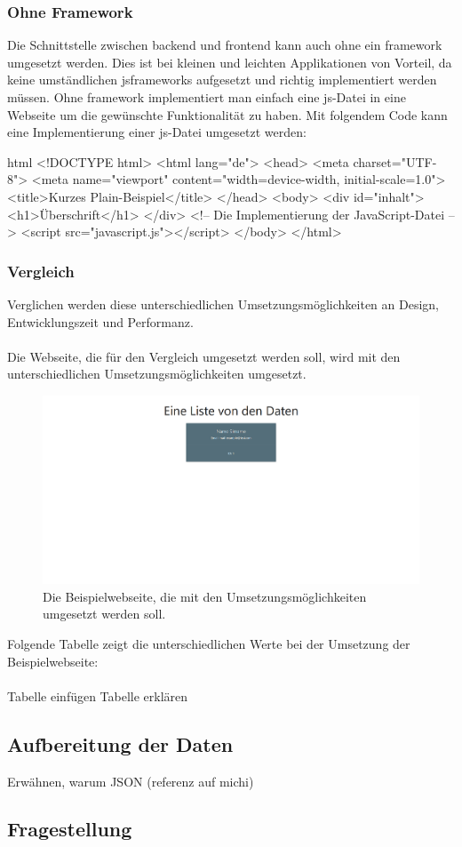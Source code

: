 \subsubsection{Ohne Framework}
Die Schnittstelle zwischen \Gls{backend} und \Gls{frontend} kann auch ohne ein \Gls{framework} umgesetzt werden. Dies ist bei kleinen und leichten Applikationen von Vorteil, da keine umständlichen \Gls{jsframework}s aufgesetzt und richtig implementiert werden müssen. Ohne \Gls{framework} implementiert man einfach eine \Gls{js}-Datei in eine Webseite um die gewünschte Funktionalität zu haben. Mit folgendem Code kann eine Implementierung einer \Gls{js}-Datei umgesetzt werden:
\begin{code}{html}
	<!DOCTYPE html>
	<html lang="de">
		<head>
			<meta charset="UTF-8">
			<meta name="viewport" content="width=device-width, initial-scale=1.0">
			<title>Kurzes Plain-Beispiel</title>
		</head>
		<body>
			<div id="inhalt">
				<h1>Überschrift</h1>
			</div>
			<!-- Die Implementierung der JavaScript-Datei -->
			<script src="javascript.js"></script>
		</body>
	</html>
\end{code}
\subsubsection{Vergleich}
Verglichen werden diese unterschiedlichen Umsetzungsmöglichkeiten an Design, Entwicklungszeit und Performanz.\\\\
Die Webseite, die für den Vergleich umgesetzt werden soll, wird mit den unterschiedlichen Umsetzungsmöglichkeiten umgesetzt.\\
\begin{figure}[H]
	\centering
	\includegraphics[width=0.8\linewidth]{images/example_page}
	\caption[Die Beispielwebseite]{Die Beispielwebseite, die mit den Umsetzungsmöglichkeiten umgesetzt werden soll.}
	\label{fig:example}
\end{figure}
Folgende Tabelle zeigt die unterschiedlichen Werte bei der Umsetzung der Beispielwebseite:
\\\\
Tabelle einfügen
Tabelle erklären
\subsection{Aufbereitung der Daten}
Erwähnen, warum JSON (referenz auf michi)
\subsection{Fragestellung}